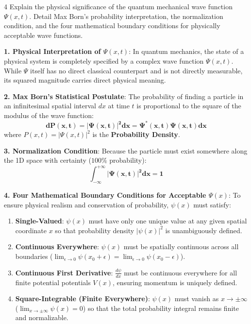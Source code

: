 \begin{theoryq}{4}
Explain the physical significance of the quantum mechanical wave function $\Psi(x,t)$. Detail Max Born's probability interpretation, the normalization condition, and the four mathematical boundary conditions for physically acceptable wave functions.
\end{theoryq}
\begin{theorysol}
\textbf{1. Physical Interpretation of $\Psi(x,t)$}:
In quantum mechanics, the state of a physical system is completely specified by a complex wave function $\Psi(x,t)$.
While $\Psi$ itself has no direct classical counterpart and is not directly measurable, its squared magnitude carries direct physical meaning.

\textbf{2. Max Born's Statistical Postulate}:
The probability of finding a particle in an infinitesimal spatial interval $dx$ at time $t$ is proportional to the square of the modulus of the wave function:
\begin{equation}
\mathbf{dP(x,t) = |\Psi(x,t)|^2 dx = \Psi^*(x,t)\Psi(x,t) dx}
\end{equation}
where $P(x,t) = |\Psi(x,t)|^2$ is the \textbf{Probability Density}.

\textbf{3. Normalization Condition}:
Because the particle must exist somewhere along the 1D space with certainty ($100\%$ probability):
\begin{equation}
\mathbf{\int_{-\infty}^{+\infty} |\Psi(x,t)|^2 dx = 1}
\end{equation}

\textbf{4. Four Mathematical Boundary Conditions for Acceptable $\Psi(x)$}:
To ensure physical realism and conservation of probability, $\psi(x)$ must satisfy:
\begin{enumerate}
    \item \textbf{Single-Valued}: $\psi(x)$ must have only one unique value at any given spatial coordinate $x$ so that probability density $|\psi(x)|^2$ is unambiguously defined.
    \item \textbf{Continuous Everywhere}: $\psi(x)$ must be spatially continuous across all boundaries ($\lim_{\epsilon\to 0}\psi(x_0+\epsilon) = \lim_{\epsilon\to 0}\psi(x_0-\epsilon)$).
    \item \textbf{Continuous First Derivative}: $\frac{d\psi}{dx}$ must be continuous everywhere for all finite potential potentials $V(x)$, ensuring momentum is uniquely defined.
    \item \textbf{Square-Integrable (Finite Everywhere)}: $\psi(x)$ must vanish as $x \to \pm\infty$ ($\lim_{x\to\pm\infty}\psi(x) = 0$) so that the total probability integral remains finite and normalizable.
\end{enumerate}

\end{theorysol}
\vspace{4mm}

